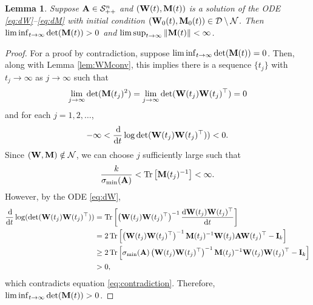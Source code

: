 \documentclass[11pt]{article}
\newtheorem{lemma}{Lemma}
\theoremstyle{definition}
\DeclareMathOperator{\tr}{Tr}
\newcommand{\dd}{\operatorname{d}\!}
\newcommand{\inv}{^{-1}}
\newcommand{\A}{{\bf A}}
\newcommand{\I}{{\bf I}}
\newcommand{\M}{{\bf M}}
\newcommand{\W}{{\bf W}}
\newcommand{\calD}{\mathcal{D}}
\newcommand{\calN}{\mathcal{N}}
\newcommand{\calS}{\mathcal{S}}
\begin{document}
\begin{lemma}\label{lem:detM}
    Suppose $\A\in\calS_{++}^n$ and $(\W(t),\M(t))$ is a solution of the ODE \eqref{eq:dW}--\eqref{eq:dM} with initial condition
    $(\W_0(t),\M_0(t))\in\calD\setminus\calN$. Then $\liminf_{t\to\infty}\det(\M(t))>0$ and $\limsup_{t\to\infty}\|\M(t)\|<\infty$. 
\end{lemma}

\begin{proof}
    For a proof by contradiction, suppose $\liminf_{t\to\infty}\det(\M(t))=0$.
    Then, along with Lemma \ref{lem:WMconv}, this implies there is a sequence $\{t_j\}$ with $t_j\to\infty$ as $j\to\infty$ such that
        $$\lim_{j\to\infty}\det(\M(t_j)^2)=\lim_{j\to\infty}\det (\W(t_j)\W(t_j)^\top)=0$$
    and for each $j=1,2,\dots$,
    \begin{align*}
        -\infty<\frac{\dd}{\dd t}\log\det(\W(t_j)\W(t_j)^\top))<0.
    \end{align*}
    Since $(\W, \M)\notin \calN$, we can choose $j$ sufficiently large such that 
    \begin{align}\label{eq:contradiction}
        \frac{k}{\sigma_{\min}(\A)}<\tr\left[\M(t_j)\inv\right]<\infty.
    \end{align}
    However, by the ODE \eqref{eq:dW}, 
    \begin{align*}
        \frac{\dd}{\dd t}\log(\det(\W(t_j)\W(t_j)^\top)) & =\tr\left[\left(\W(t_j)\W(t_j)^\top\right)\inv \frac{\dd\W(t_j)\W(t_j)^\top}{\dd t}\right] \\
        & = 2\tr\left[\left(\W(t_j)\W(t_j)^\top\right)\inv\M(t_j)\inv\W(t_j)\A\W(t_j)^\top-\I_k\right] \\
        & \ge 2\tr\left[\sigma_{\min}(\A)\left(\W(t_j)\W(t_j)^\top\right)\inv\M(t_j)\inv\W(t_j)\W(t_j)^\top-\I_k\right] \\
        & > 0,
    \end{align*}
    which contradicts equation \eqref{eq:contradiction}.
    Therefore, $\liminf_{t\to\infty}\det(\M(t))>0$.


\end{proof}
\end{document}
